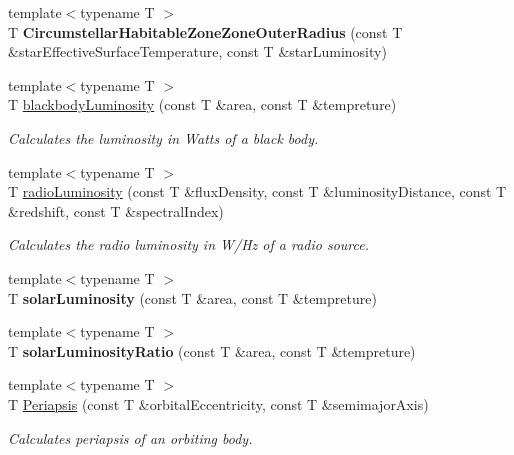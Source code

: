 \begin{DoxyCompactItemize}
\item 
\mbox{\label{namespace_e_g_x_phys_ac6f89712c52ce26e1e2085fd85a914ea}} 
{\footnotesize template$<$typename T $>$ }\\T {\bfseries Circumstellar\+Habitable\+Zone\+Zone\+Outer\+Radius} (const T \&star\+Effective\+Surface\+Temperature, const T \&star\+Luminosity)
\item 
{\footnotesize template$<$typename T $>$ }\\T \hyperlink{group___astrophysics_ga909f82edfaed449b44e94788b642ebb8}{blackbody\+Luminosity} (const T \&area, const T \&tempreture)
\begin{DoxyCompactList}\small\item\em Calculates the luminosity in Watts of a black body. \end{DoxyCompactList}\item 
{\footnotesize template$<$typename T $>$ }\\T \hyperlink{group___astrophysics_ga6d6865b2aac1bc7c7f06b7c4ac2444e4}{radio\+Luminosity} (const T \&flux\+Density, const T \&luminosity\+Distance, const T \&redshift, const T \&spectral\+Index)
\begin{DoxyCompactList}\small\item\em Calculates the radio luminosity in W/\+Hz of a radio source. \end{DoxyCompactList}\item 
\mbox{\label{namespace_e_g_x_phys_ade3d05c9dcd810cb5290375d11587b6a}} 
{\footnotesize template$<$typename T $>$ }\\T {\bfseries solar\+Luminosity} (const T \&area, const T \&tempreture)
\item 
\mbox{\label{namespace_e_g_x_phys_ac5e66686d7910587e3636b7984d466e9}} 
{\footnotesize template$<$typename T $>$ }\\T {\bfseries solar\+Luminosity\+Ratio} (const T \&area, const T \&tempreture)
\item 
{\footnotesize template$<$typename T $>$ }\\T \hyperlink{group___periapsis_ga4414ac75539371ec874a3d25cad6c9fe}{Periapsis} (const T \&orbital\+Eccentricity, const T \&semimajor\+Axis)
\begin{DoxyCompactList}\small\item\em Calculates periapsis of an orbiting body. \end{DoxyCompactList}\item 

\end{DoxyCompactItemize}
